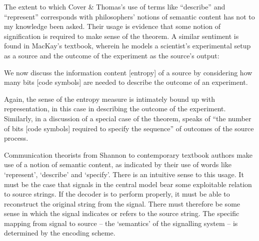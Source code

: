 \noindent The extent to which Cover \& Thomas's use of terms like ``describe'' and ``represent'' corresponds with philosophers' notions of semantic content has not to my knowledge been asked.
Their usage is evidence that some notion of signification is required to make sense of the theorem.
A similar sentiment is found in MacKay's textbook, wherein he models a scientist's experimental setup as a source and the outcome of the experiment as the source's output:

\begin{myquote}
We now discuss the information content [entropy] of a source by considering how many bits [code symbols] are needed to describe the outcome of an experiment.
\par\hspace*{\fill}\citet[73]{mackay2003information}
\end{myquote}

\noindent Again, the sense of the entropy measure is intimately bound up with representation, in this case in describing the outcome of the experiment.
Similarly, in a discussion of a special case of the theorem, \citet[397]{shannon1948mathematicalc} speaks of ``the number of bits [code symbols] required to specify the sequence'' of outcomes of the source process.

Communication theorists from Shannon to contemporary textbook authors make use of a notion of semantic content, as indicated by their use of words like `represent', `describe' and `specify'.
There is an intuitive sense to this usage.
It must be the case that signals in the central model bear some exploitable relation to source strings.
If the decoder is to perform properly, it must be able to reconstruct the original string from the signal.
There must therefore be some sense in which the signal indicates or refers to the source string.
The specific mapping from signal to source -- the `semantics' of the signalling system -- is determined by the encoding scheme.

